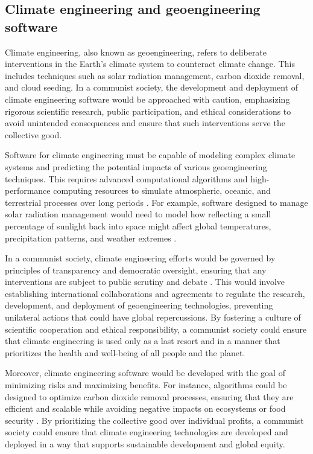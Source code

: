 \subsection{Climate engineering and geoengineering software}

Climate engineering, also known as geoengineering, refers to deliberate interventions in the Earth’s climate system to counteract climate change. This includes techniques such as solar radiation management, carbon dioxide removal, and cloud seeding. In a communist society, the development and deployment of climate engineering software would be approached with caution, emphasizing rigorous scientific research, public participation, and ethical considerations to avoid unintended consequences and ensure that such interventions serve the collective good.

Software for climate engineering must be capable of modeling complex climate systems and predicting the potential impacts of various geoengineering techniques. This requires advanced computational algorithms and high-performance computing resources to simulate atmospheric, oceanic, and terrestrial processes over long periods \cite[pp.~55-63]{crutzen2006geoengineering}. For example, software designed to manage solar radiation management would need to model how reflecting a small percentage of sunlight back into space might affect global temperatures, precipitation patterns, and weather extremes \cite[pp.~180-188]{keith2013climate}.

In a communist society, climate engineering efforts would be governed by principles of transparency and democratic oversight, ensuring that any interventions are subject to public scrutiny and debate \cite[pp.~245-252]{shepherd2009geoengineering}. This would involve establishing international collaborations and agreements to regulate the research, development, and deployment of geoengineering technologies, preventing unilateral actions that could have global repercussions. By fostering a culture of scientific cooperation and ethical responsibility, a communist society could ensure that climate engineering is used only as a last resort and in a manner that prioritizes the health and well-being of all people and the planet.

Moreover, climate engineering software would be developed with the goal of minimizing risks and maximizing benefits. For instance, algorithms could be designed to optimize carbon dioxide removal processes, ensuring that they are efficient and scalable while avoiding negative impacts on ecosystems or food security \cite[pp.~134-142]{macmartin2016solar}. By prioritizing the collective good over individual profits, a communist society could ensure that climate engineering technologies are developed and deployed in a way that supports sustainable development and global equity.

